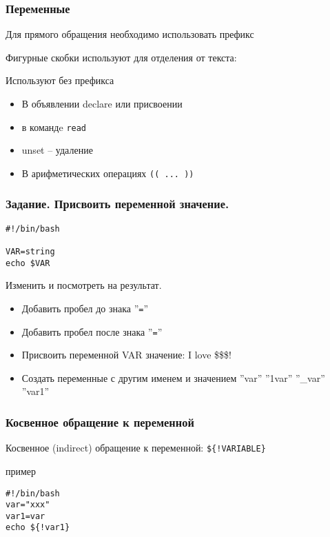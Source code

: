 

\begin{frame}
	\frametitle{Переменные} 
	\large{}

	Для прямого обращения необходимо использовать префикс \\
	\center{\Large{\tt \$}}

	Фигурные скобки используют для отделения от текста:\\

	
	\begin{alertblock}{Используют без префикса}
		\begin{itemize}
			\item В объявлении declare или присвоении
			\item в командe {\tt read}
			\item unset -- удаление
			\item В арифметических операциях {\tt (( ... ))}
		\end{itemize}
	\end{alertblock}
\end{frame}

\begin{frame}[fragile]
	\frametitle{Задание. Присвоить переменной значение.}

	\begin{lstlisting}
#!/bin/bash

VAR=string
echo $VAR
	\end{lstlisting}


	\begin{block}{Изменить и посмотреть на результат.}
		\begin{itemize}
			\item Добавить пробел до знака ''{\tt =}''
			\item Добавить пробел после знака ''{\tt =}''
			\item Присвоить переменной VAR значение: I love \$\$\$!
			\item Создать переменные с другим именем и значением ''var'' ''1var'' ''\_var'' ''var1''
		\end{itemize}
	\end{block}

\end{frame}

\begin{frame}[fragile]
	\frametitle{Косвенное обращение к переменной}

	Косвенное (indirect) обращение к переменной: {\tt \$\{!VARIABLE\}}

	\begin{block}{пример}
		\begin{lstlisting}
#!/bin/bash 
var="xxx"
var1=var
echo ${!var1}
		\end{lstlisting}
	\end{block}

\end{frame}

